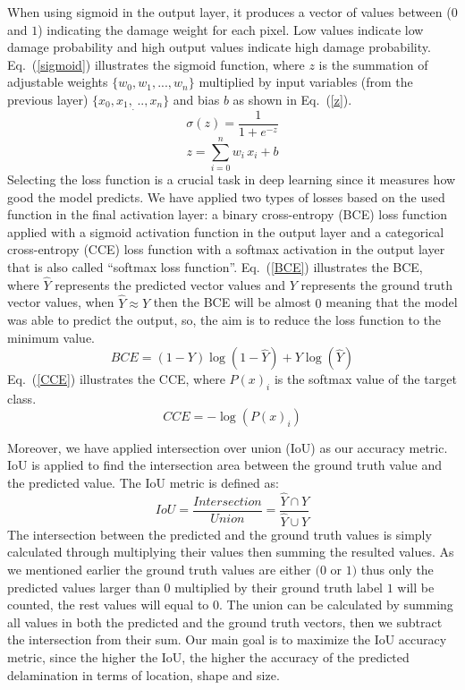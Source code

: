 When using sigmoid in the output layer, it produces a vector of values between (\(0\) and \(1\)) indicating the damage weight for each pixel. 
Low values indicate low damage probability and high output values indicate high damage probability. Eq.~(\ref{sigmoid}) illustrates the sigmoid function, where \(z\) is the summation of adjustable weights \(\{w_0,w_1,...,w_n \}\) multiplied by input variables (from the previous layer) \(\{x_0,x_1,_...,x_n\}\) and bias \(b\) as shown in Eq.~(\ref{z}).	
	\begin{equation}
		\sigma(z) = \frac{1}{1+e^{-z}}
		\label{sigmoid}
	\end{equation}
	\begin{equation}
		z= \sum_{i=0}^{n}  w_i\, x_i +b
		\label{z}
	\end{equation}
Selecting the loss function is a crucial task in deep learning since it measures how good the model predicts.
We have applied two types of losses based on the used function in the final activation layer: a binary cross-entropy (BCE) loss function applied with a sigmoid activation function in the output layer and a categorical cross-entropy (CCE) loss function with a softmax activation in the output layer that is also called \enquote{softmax loss function}.
Eq.~(\ref{BCE}) illustrates the BCE, where \(\hat{Y}\) represents the predicted vector values and \(Y\) represents the ground truth vector values, when \(\hat{Y} \approx Y\) then the BCE will be almost \(0\) meaning that the model was able to predict the output, so, the aim is to reduce the loss function to the minimum value.
	\begin{equation}
		BCE = (1-Y)\log(1-\hat{Y})+Y\log(\hat{Y})
		\label{BCE}
	\end{equation}
Eq.~(\ref{CCE}) illustrates the CCE, where \( P(x)_{i}\) is the softmax value of the target class. 
	\begin{equation}
	CCE = -\log\left( P(x)_{i} \right)
	\label{CCE}
	\end{equation}

Moreover, we have applied intersection over union (IoU) as our accuracy metric. 
IoU is applied to find the intersection area between the ground truth value and the predicted value.  
The IoU metric is defined as:
\begin{equation}
IoU = \frac{Intersection}{Union} = \frac{\hat{Y} \cap Y}{\hat{Y} \cup Y} 
\label{IoU}
\end{equation}
The intersection between the predicted and the ground truth values is simply calculated through multiplying their values then summing the resulted values.
As we mentioned earlier the ground truth values are either \((0\) or \(1)\) thus only the predicted values larger than \(0\) multiplied by their ground truth label \(1\) will be counted, the rest values will equal to \(0\). 
The union can be calculated by summing all values in both the predicted and the ground truth  vectors, then we subtract the intersection from their sum.
Our main goal is to maximize the IoU accuracy metric, since the higher the IoU, the higher the accuracy of the predicted delamination in terms of location, shape and size.
	

